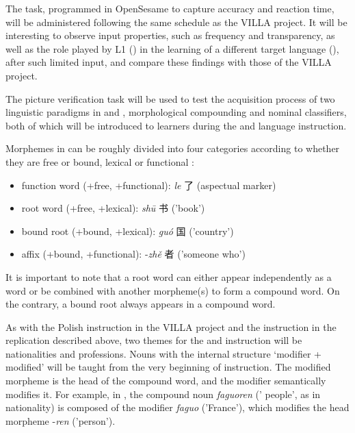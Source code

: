 \documentclass[output=paper,colorlinks,citecolor=brown,modfonts,nonflat]{../langscibook}
\begin{document}
The task, programmed in OpenSesame to capture accuracy and reaction time, will be administered following the same schedule as the VILLA project. It will be interesting to observe input properties, such as frequency and transparency, as well as the role played by L1 () in the learning of a different target language (), after such limited input, and compare these findings with those of the VILLA project.

\label{sec:watorek:4.2.2.2}

The picture verification task will be used to test the acquisition process of two linguistic paradigms in  and , morphological compounding and nominal classifiers, both of which will be introduced to learners during the  and  language instruction.


\label{sec:watorek:4.2.2.2.1}

Morphemes in  can be roughly divided into four categories according to whether they are free or bound, lexical or functional \citep{Packard2000}: 

\begin{itemize}
    \item function word (+free, +functional): \textit{le} {\cjkfont 了} (aspectual marker)
    \item root word (+free, +lexical): \textit{shū} {\cjkfont 书} ('book')
    \item bound root (+bound, +lexical): \textit{guó} {\cjkfont 国} ('country')
    \item affix (+bound, +functional): -\textit{zhě} {\cjkfont 者} ('someone who')
\end{itemize}

It is important to note that a root word can either appear independently as a word or be combined with another morpheme(s) to form a compound word. On the contrary, a bound root always appears in a compound word.

As with the Polish instruction in the VILLA project and the  instruction in the replication described above, two themes for the  and  instruction will be nationalities and professions. Nouns with the internal structure ‘modifier + modified’ will be taught from the very beginning of instruction. The modified morpheme is the head of the compound word, and the modifier semantically modifies it. For example, in , the compound noun \textit{faguoren} (' people', as in nationality) is composed of the modifier \textit{faguo} ('France'), which modifies the head morpheme -\textit{ren} ('person').
\end{document}
